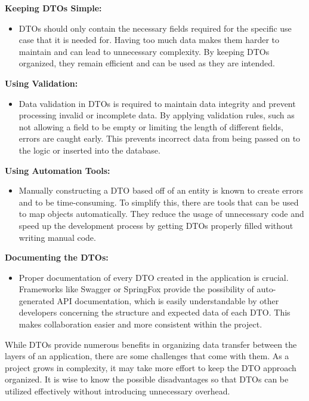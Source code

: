     \textbf{Keeping DTOs Simple:}
        \begin{itemize}
            \item DTOs should only contain the necessary fields required for the specific use case that it is needed for. Having too much data makes them harder to maintain and can lead to unnecessary complexity. By keeping DTOs organized, they remain efficient and can be used as they are intended.
        \end{itemize}
    \textbf{Using Validation:}
        \begin{itemize}
            \item Data validation in DTOs is required to maintain data integrity and prevent processing invalid or incomplete data. By applying validation rules, such as not allowing a field to be empty or limiting the length of different fields, errors are caught early. This prevents incorrect data from being passed on to the logic or inserted into the database.
        \end{itemize}
    \textbf{Using Automation Tools:}
        \begin{itemize}
            \item Manually constructing a DTO based off of an entity is known to create errors and to be time-consuming. To simplify this, there are tools that can be used to map objects automatically. They reduce the usage of unnecessary code and speed up the development process by getting DTOs properly filled without writing manual code.
        \end{itemize}
    \textbf{Documenting the DTOs:}
        \begin{itemize}
            \item Proper documentation of every DTO created in the application is crucial. Frameworks like Swagger or SpringFox provide the possibility of auto-generated API documentation, which is easily understandable by other developers concerning the structure and expected data of each DTO. This makes collaboration easier and more consistent within the project. 
        \end{itemize} 
    While DTOs provide numerous benefits in organizing data transfer between the layers of an application, there are some challenges that come with them. As a project grows in complexity, it may take more effort to keep the DTO approach organized. It is wise to know the possible disadvantages so that DTOs can be utilized effectively without introducing unnecessary overhead.

    \blankLine

